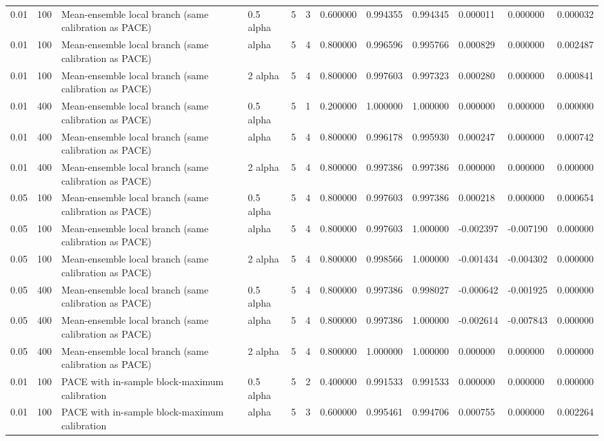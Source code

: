 \begin{tabular}{llllllllllll}
0.01 & 100 & Mean-ensemble local branch (same calibration as PACE) & 0.5 alpha & 5 & 3 & 0.600000 & 0.994355 & 0.994345 & 0.000011 & 0.000000 & 0.000032 \\
0.01 & 100 & Mean-ensemble local branch (same calibration as PACE) & alpha & 5 & 4 & 0.800000 & 0.996596 & 0.995766 & 0.000829 & 0.000000 & 0.002487 \\
0.01 & 100 & Mean-ensemble local branch (same calibration as PACE) & 2 alpha & 5 & 4 & 0.800000 & 0.997603 & 0.997323 & 0.000280 & 0.000000 & 0.000841 \\
0.01 & 400 & Mean-ensemble local branch (same calibration as PACE) & 0.5 alpha & 5 & 1 & 0.200000 & 1.000000 & 1.000000 & 0.000000 & 0.000000 & 0.000000 \\
0.01 & 400 & Mean-ensemble local branch (same calibration as PACE) & alpha & 5 & 4 & 0.800000 & 0.996178 & 0.995930 & 0.000247 & 0.000000 & 0.000742 \\
0.01 & 400 & Mean-ensemble local branch (same calibration as PACE) & 2 alpha & 5 & 4 & 0.800000 & 0.997386 & 0.997386 & 0.000000 & 0.000000 & 0.000000 \\
0.05 & 100 & Mean-ensemble local branch (same calibration as PACE) & 0.5 alpha & 5 & 4 & 0.800000 & 0.997603 & 0.997386 & 0.000218 & 0.000000 & 0.000654 \\
0.05 & 100 & Mean-ensemble local branch (same calibration as PACE) & alpha & 5 & 4 & 0.800000 & 0.997603 & 1.000000 & -0.002397 & -0.007190 & 0.000000 \\
0.05 & 100 & Mean-ensemble local branch (same calibration as PACE) & 2 alpha & 5 & 4 & 0.800000 & 0.998566 & 1.000000 & -0.001434 & -0.004302 & 0.000000 \\
0.05 & 400 & Mean-ensemble local branch (same calibration as PACE) & 0.5 alpha & 5 & 4 & 0.800000 & 0.997386 & 0.998027 & -0.000642 & -0.001925 & 0.000000 \\
0.05 & 400 & Mean-ensemble local branch (same calibration as PACE) & alpha & 5 & 4 & 0.800000 & 0.997386 & 1.000000 & -0.002614 & -0.007843 & 0.000000 \\
0.05 & 400 & Mean-ensemble local branch (same calibration as PACE) & 2 alpha & 5 & 4 & 0.800000 & 1.000000 & 1.000000 & 0.000000 & 0.000000 & 0.000000 \\
0.01 & 100 & PACE with in-sample block-maximum calibration & 0.5 alpha & 5 & 2 & 0.400000 & 0.991533 & 0.991533 & 0.000000 & 0.000000 & 0.000000 \\
0.01 & 100 & PACE with in-sample block-maximum calibration & alpha & 5 & 3 & 0.600000 & 0.995461 & 0.994706 & 0.000755 & 0.000000 & 0.002264 \\

\end{tabular}
